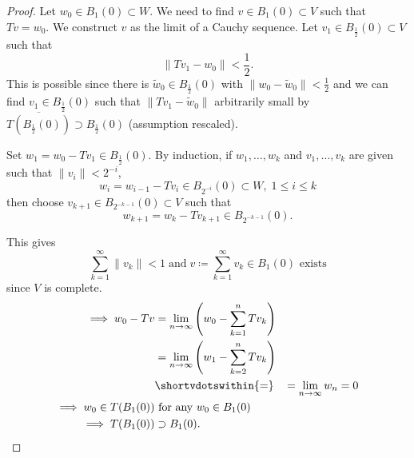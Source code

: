 \documentclass{article}
\begin{document}
\begin{proof}
    Let $w_0 \in B_1(0) \subset W$. We need to find $v \in B_1(0) \subset V$ such that $T v = w_0$. We construct $v$ as the limit of a Cauchy sequence.
    Let $v_1 \in B_{\frac{1}{2}}(0) \subset V$ such that
    \begin{equation*}\|Tv_1 - w_0\| < \frac{1}{2}.\end{equation*}
    This is possible since there is $\widetilde{w}_0 \in B_{\frac{1}{2}}(0)$ with $\|w_0 - \widetilde{w}_0\| < \frac{1}{2}$ and we can find $v_1 \in B_\frac{1}{2}(0)$ such that $\|Tv_1 - \widetilde{w}_0\|$ arbitrarily small by $\overline{T(B_\frac{1}{2}(0))} \supset B_\frac{1}{2}(0)$ (assumption rescaled).

    Set $w_1 = w_0 - T v_1 \in B_\frac{1}{2}(0)$.
    By induction, if $w_1, \dotsc, w_k$ and $v_1, \dotsc, v_k$ are given such that $\|v_i\| < 2^{-i}$,
    \begin{equation*}
        w_i = w_{i-1} - T v_i \in B_{2^{-i}}(0) \subset W, \; 1 \leq i \leq k
    \end{equation*}
    then choose $v_{k+1} \in B_{2^{-k-1}}(0) \subset V$ such that
    \begin{equation*}
        w_{k+1} = w_k - T v_{k+1} \in B_{2^{-k-1}}(0).
    \end{equation*}

    This gives
    \begin{equation*}
    \sum_{k=1}^\infty \|v_k\| < 1 \; \text{and} \; v \coloneqq \sum_{k=1}^\infty v_k \in B_1(0) \text{ exists}
    \end{equation*}
    since $V$ is complete.
    \begin{align*}
        \implies w_0 - Tv &= \lim_{n \to \infty} \left(w_0 - \sum_{k=1}^n T v_k\right) \\
                          &= \lim_{n \to \infty} \left(w_1 - \sum_{k=2}^n T v_k\right) \\
                          &\shortvdotswithin{=}
                          &= \lim_{n \to \infty} w_n = 0 \\
        \implies w_0 \in T(B_1(0)) &\text{ for any } w_0 \in B_1(0) \\
        \implies T(B_1(0)) &\supset B_1(0). \qedhere
    \end{align*}
\end{proof}

\end{document}
